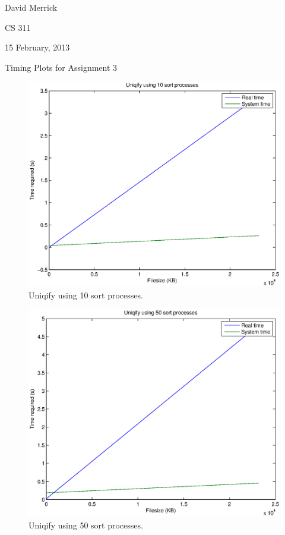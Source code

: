 \documentclass[letterpaper,10pt,titlepage]{article}
\begin{document}
David Merrick

CS 311

15 February, 2013

\begin{center}
{\LARGE Timing Plots for Assignment 3}
\end{center}

\begin{figure}[H]
	\begin{center}
	\includegraphics[width=8in]{figure1}
	\end{center}
	\caption{Uniqify using 10 sort processes.}
\end{figure}
\begin{figure}[H]
	\begin{center}
	\includegraphics[width=8in]{figure2}
	\end{center}
	\caption{Uniqify using 50 sort processes.}
\end{figure}
\end{document}
